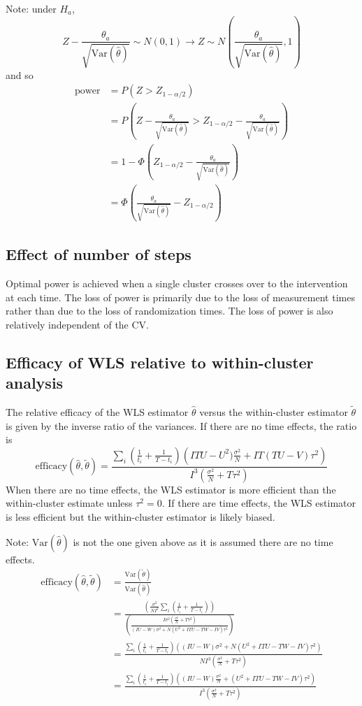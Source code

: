 \documentclass{article}
\newcommand{\Var}{\mathrm{Var}}
\begin{document}
Note: under $H_a$,
\[
Z-\frac{\theta_a}{\sqrt{\Var(\hat{\theta})}} \sim N(0,1) \rightarrow Z \sim N\left(\frac{\theta_a}{\sqrt{\Var(\hat{\theta})}},1\right)
\]
and so
\begin{align*}
\text{power} &= P\left(Z>Z_{1-\alpha/2}\right) \\
&= P\left(Z-\frac{\theta_a}{\sqrt{\Var(\hat{\theta})}} >Z_{1-\alpha/2} - \frac{\theta_a}{\sqrt{\Var(\hat{\theta})}}\right) \\
&= 1 - \Phi\left(Z_{1-\alpha/2} - \frac{\theta_a}{\sqrt{\Var(\hat{\theta})}}\right) \\
&= \Phi\left(\frac{\theta_a}{\sqrt{\Var(\hat{\theta})}}-Z_{1-\alpha/2}\right)
\end{align*}

\subsection{Effect of number of steps}

Optimal power is achieved when a single cluster crosses over to the intervention at each time. The loss of power is primarily due to the loss of measurement times rather than due to the loss of randomization times. The loss of power is also relatively independent of the CV.

\subsection{Efficacy of WLS relative to within-cluster analysis}

The relative efficacy of the WLS estimator $\hat{\theta}$ versus the within-cluster estimator $\tilde{\theta}$ is given by the inverse ratio of the variances. If there are no time effects, the ratio is
\[
\mathrm{efficacy}(\hat{\theta},\tilde{\theta}) = \frac{\sum_i\left(\frac{1}{t_i}+\frac{1}{T-t_i}\right)\left(ITU-U^2)\frac{\sigma^2}{N}+IT(TU-V)\tau^2\right)}{I^3\left(\frac{\sigma^2}{N}+T\tau^2\right)}
\]
When there are no time effects, the WLS estimator is more efficient than the within-cluster estimate unless $\tau^2=0$. If there are time effects, the WLS estimator is less efficient but the within-cluster estimator is likely biased.

Note: $\Var(\hat{\theta})$ is not the one given above as it is assumed there are no time effects.
\begin{align*}
\mathrm{efficacy}(\hat{\theta},\tilde{\theta}) &= \frac{\Var(\tilde{\theta})}{\Var(\hat{\theta})} \\
&= \frac{\left(\frac{\sigma^2}{NI^2}\sum_i\left(\frac{1}{t_i}+\frac{1}{T-t_i}\right)\right)}{\left(\frac{I\sigma^2\left(\frac{\sigma^2}{N}+T\tau^2\right)}{(IU-W)\sigma^2+N(U^2+ITU-TW-IV)\tau^2}\right)} \\
&= \frac{\sum_i\left(\frac{1}{t_i}+\frac{1}{T-t_i}\right)\left((IU-W)\sigma^2+N(U^2+ITU-TW-IV)\tau^2\right)}{NI^3\left(\frac{\sigma^2}{N}+T\tau^2\right)} \\
&= \frac{\sum_i\left(\frac{1}{t_i}+\frac{1}{T-t_i}\right)\left((IU-W)\frac{\sigma^2}{N}+(U^2+ITU-TW-IV)\tau^2\right)}{I^3\left(\frac{\sigma^2}{N}+T\tau^2\right)} 
\end{align*}
\end{document}
